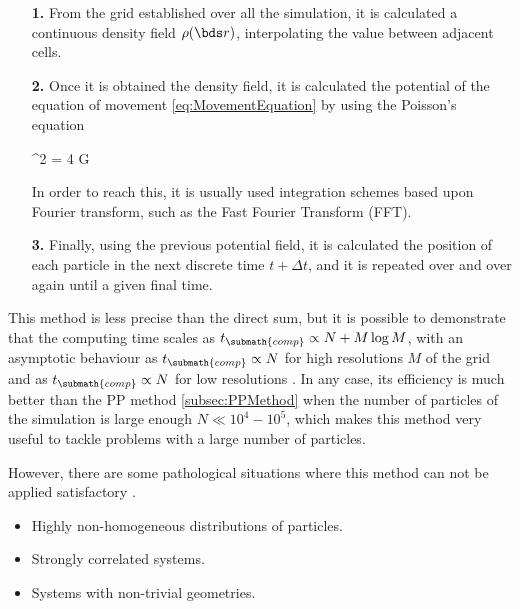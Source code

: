 \begin{itemize}
\item[\textbf{1.}] From the grid established over all the simulation, it
is calculated a continuous density field $\rho(\bds r)$, interpolating the
value between adjacent cells.

\item[\textbf{2.}] Once it is obtained the density field, it is calculated
the potential of the equation of movement \ref{eq:MovementEquation} by 
using the Poisson's equation



{ \nabla^2 \phi = 4 \pi G \rho }


In order to reach this, it is usually used integration schemes based upon
Fourier transform, such as the Fast Fourier Transform (FFT).


\item[\textbf{3.}] Finally, using the previous potential field, it is 
calculated the position of each particle in the next discrete time
$t+\Delta t$, and it is repeated over and over again until a given
final time.
\end{itemize}


This method is less precise than the direct sum, but it is possible to 
demonstrate that the computing time scales as $t_{\submath{comp}} 
\propto N + M \log M$, with an asymptotic behaviour as $t_{\submath{comp}} 
\propto N$ for high resolutions $M$ of the grid and as $t_{\submath{comp}} 
\propto N$ for low resolutions \cite{pfalzner1996}. In any case, its 
efficiency is much better than the PP method \ref{subsec:PPMethod} when
the number of particles of the simulation is large enough $N\ll 10^4 - 
10^5$, which makes this method very useful to tackle problems with a large
number of particles.


However, there are some pathological situations where this method can not
be applied satisfactory \cite{pfalzner1996}.


\begin{itemize}
\item Highly non-homogeneous distributions of particles.
\item Strongly correlated systems.
\item Systems with non-trivial geometries.
\end{itemize}


